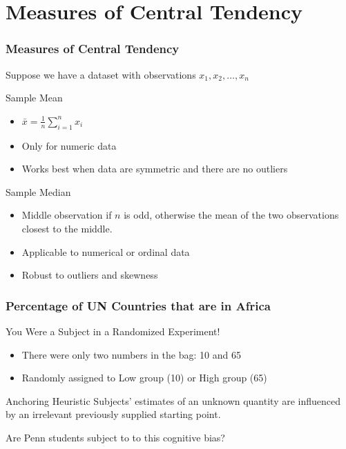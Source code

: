 \section{Measures of Central Tendency}

\begin{frame}
\frametitle{Measures of Central Tendency}
Suppose we have a dataset with observations $x_1, x_2, \hdots, x_n$
	\begin{block}{Sample Mean}
		\begin{itemize}
			\item $\displaystyle\bar{x} = \frac{1}{n} \sum_{i=1}^n x_i$
			\item Only for numeric data
			\item Works best when data are symmetric and there are no outliers
		\end{itemize}
	\end{block}\pause
	\begin{block}{Sample Median}
		\begin{itemize}
		\item Middle observation if $n$ is odd, otherwise the mean of the two observations closest to the middle.
		\item Applicable to numerical or ordinal data
		\item Robust to outliers and skewness
		\end{itemize}
	\end{block}
\end{frame}
\begin{frame}
\frametitle{Percentage of UN Countries that are in Africa}
\begin{block}{You Were a Subject in a Randomized Experiment!}
	\begin{itemize}
		\item There were only two numbers in the bag: 10 and 65
		\item Randomly assigned to Low group (10) or High group (65)
	\end{itemize}
	\end{block} \pause
\begin{block}{Anchoring Heuristic \href{http://www.jstor.org/stable/1738360}{}}
	Subjects' estimates of an unknown quantity are influenced by an irrelevant previously supplied starting point.
\end{block}
\begin{alertblock}{Are Penn students subject to to this cognitive bias?}
\end{alertblock}
\end{frame}
